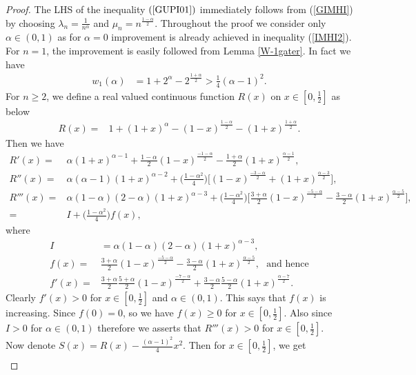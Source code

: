 \documentclass[12pt]{amsart}
\theoremstyle{definition}
\theoremstyle{plain}
\theoremstyle{definition}
\numberwithin{equation}{section}
\begin{document}
\begin{proof}
The LHS of the inequality $(\ref{GUPI01})$ immediately follows from (\ref{GIMHI}) by choosing $\lambda_{n}=\frac{1}{n^{\alpha}}$ and $\mu_{n}=n^{\frac{1-\alpha}{2}}$. Throughout the proof we consider only $\alpha\in(0, 1)$ as for $\alpha=0$ improvement is already achieved in inequality (\ref{IMHI2}). For $n=1$, the improvement is easily followed from Lemma \ref{W-1gater}. In fact we have
\begin{align*}
w_{1}(\alpha)&=1+2^{\alpha}-2^{\frac{1+\alpha}{2}}> \frac{1}{4}(\alpha-1)^2.
\end{align*}
For $n\geq 2$, we define a real valued continuous function $R(x)$ on $x\in[0, \frac{1}{2}]$ as below
\begin{align*}
R(x)=&1+(1+x)^{\alpha}-(1-x)^{\frac{1-\alpha}{2}}-(1+x)^{\frac{1+\alpha}{2}}.
\end{align*}
Then we have
\begin{align*}
R'(x)=&\alpha(1+x)^{\alpha-1}+\frac{1-\alpha}{2}(1-x)^{\frac{-1-\alpha}{2}}-\frac{1+\alpha}{2}(1+x)^{\frac{\alpha-1}{2}},\\
R''(x)=&\alpha(\alpha-1)(1+x)^{\alpha-2}+\big(\frac{1-\alpha^{2}}{4}\big)\Big[(1-x)^{\frac{-3-\alpha}{2}}+(1+x)^{\frac{\alpha-3}{2}}\Big],\\
R'''(x)=&\alpha(1-\alpha)(2-\alpha)(1+x)^{\alpha-3}+\big(\frac{1-\alpha^{2}}{4}\big)\Big[\frac{3+\alpha}{2}(1-x)^{\frac{-5-\alpha}{2}}-
\frac{3-\alpha}{2}(1+x)^{\frac{\alpha-5}{2}}\Big],\\
=&I+\big(\frac{1-\alpha^{2}}{4}\big)f(x),
\end{align*}where
\begin{align*}
I&=\alpha(1-\alpha)(2-\alpha)(1+x)^{\alpha-3},\\
f(x)=&\frac{3+\alpha}{2}(1-x)^{\frac{-5-\alpha}{2}}-\frac{3-\alpha}{2}(1+x)^{\frac{\alpha-5}{2}},~~~\mbox{and hence}\\
f'(x)=&\frac{3+\alpha}{2}\frac{5+\alpha}{2}(1-x)^{\frac{-7-\alpha}{2}}+\frac{3-\alpha}{2}\frac{5-\alpha}{2}(1+x)^{\frac{\alpha-7}{2}}.
\end{align*}
Clearly $f'(x)>0$ for $x\in[0, \frac{1}{2}]$ and $\alpha\in(0, 1)$. This says that $f(x)$ is increasing. Since $f(0)=0$, so we have $f(x)\geq 0$ for $x\in[0, \frac{1}{2}]$.
Also since $I>0$ for $\alpha\in (0, 1)$ therefore we asserts that $R'''(x)>0$ for $x\in[0, \frac{1}{2}]$.\\
Now denote $S(x)=R(x)-\frac{(\alpha-1)^2}{4}x^{2}$. Then for $x\in[0, \frac{1}{2}]$, we get
\begin{align*}

\end{align*}
\end{proof}
\end{document}

